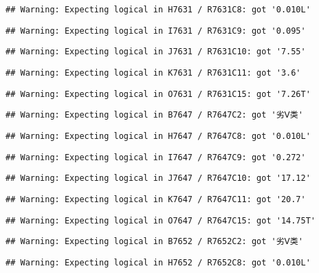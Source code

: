 \documentclass[
]{article}
\begin{document}
\begin{verbatim}
## Warning: Expecting logical in H7631 / R7631C8: got '0.010L'
\end{verbatim}

\begin{verbatim}
## Warning: Expecting logical in I7631 / R7631C9: got '0.095'
\end{verbatim}

\begin{verbatim}
## Warning: Expecting logical in J7631 / R7631C10: got '7.55'
\end{verbatim}

\begin{verbatim}
## Warning: Expecting logical in K7631 / R7631C11: got '3.6'
\end{verbatim}

\begin{verbatim}
## Warning: Expecting logical in O7631 / R7631C15: got '7.26T'
\end{verbatim}

\begin{verbatim}
## Warning: Expecting logical in B7647 / R7647C2: got '劣Ⅴ类'
\end{verbatim}

\begin{verbatim}
## Warning: Expecting logical in H7647 / R7647C8: got '0.010L'
\end{verbatim}

\begin{verbatim}
## Warning: Expecting logical in I7647 / R7647C9: got '0.272'
\end{verbatim}

\begin{verbatim}
## Warning: Expecting logical in J7647 / R7647C10: got '17.12'
\end{verbatim}

\begin{verbatim}
## Warning: Expecting logical in K7647 / R7647C11: got '20.7'
\end{verbatim}

\begin{verbatim}
## Warning: Expecting logical in O7647 / R7647C15: got '14.75T'
\end{verbatim}

\begin{verbatim}
## Warning: Expecting logical in B7652 / R7652C2: got '劣Ⅴ类'
\end{verbatim}

\begin{verbatim}
## Warning: Expecting logical in H7652 / R7652C8: got '0.010L'
\end{verbatim}
\end{document}
